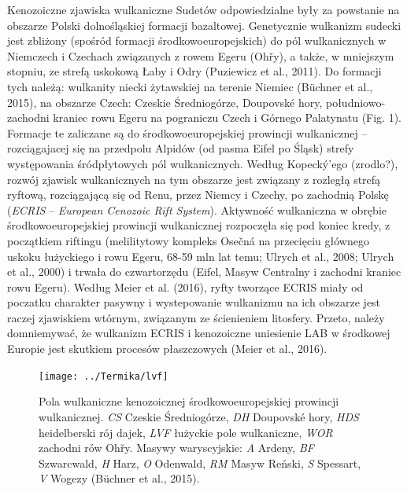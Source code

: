 \documentclass[11.5pt,twoside]{report}
\begin{document}
Kenozoiczne zjawiska wulkaniczne Sudetów odpowiedzialne były za powstanie na obszarze Polski dolnośląskiej formacji bazaltowej. Genetycznie wulkanizm sudecki jest zbliżony (spośród formacji środkowoeuropejskich) do pól wulkanicznych w Niemczech i Czechach związanych z rowem Egeru (Oh\v{r}y), a także, w mniejszym stopniu, ze strefą uskokową Łaby i Odry (Puziewicz et al., 2011). Do formacji tych należą: wulkanity niecki żytawskiej na terenie Niemiec (B\"{u}chner et al., 2015), na obszarze Czech: Czeskie Średniogórze, Doupovské hory, południowo-zachodni kraniec rowu Egeru na pograniczu Czech i Górnego Palatynatu (Fig. 1). Formacje te zaliczane są do środkowoeuropejskiej prowincji wulkanicznej -- rozciągajacej się na przedpolu Alpidów (od pasma Eifel po Śląsk) strefy występowania śródpłytowych pól wulkanicznych. Według Kopeck\'{y}'ego (zrodlo?), rozwój zjawisk wulkanicznych na tym obszarze jest związany z rozległą strefą ryftową, rozciągającą się od Renu, przez Niemcy i Czechy, po zachodnią Polskę (\textit{ECRIS} -- \textit{European Cenozoic Rift System}). Aktywność wulkaniczna w obrębie środkowoeuropejskiej prowincji wulkanicznej rozpoczęła się pod koniec kredy, z początkiem riftingu (melilitytowy kompleks Osečná na przecięciu głównego uskoku łużyckiego i rowu Egeru, 68-59 mln lat temu; Ulrych et al., 2008; Ulrych et al., 2000) i trwała do czwartorzędu (Eifel, Masyw Centralny i zachodni kraniec rowu Egeru). Według Meier et al. (2016), ryfty tworzące ECRIS miały od poczatku charakter pasywny i wystepowanie wulkanizmu na ich obszarze jest raczej zjawiskiem wtórnym, związanym ze ścienieniem litosfery. Przeto, należy domniemywać, że wulkanizm ECRIS i kenozoiczne uniesienie LAB w środkowej Europie jest skutkiem procesów płaszczowych (Meier et al., 2016).

\begin{figure}[h]
	\centering
	\texttt{[image: ../Termika/lvf]}
	\caption{Pola wulkaniczne kenozoicznej środkowoeuropejskiej prowincji wulkanicznej. \textit{CS} Czeskie Średniogórze, \textit{DH} Doupovsk\'{e} hory, \textit{HDS} heidelberski rój dajek, \textit{LVF} łużyckie pole wulkaniczne, \textit{WOR} zachodni rów Oh\v{r}y. Masywy waryscyjskie: \textit{A} Ardeny, \textit{BF} Szwarcwald, \textit{H} Harz, \textit{O} Odenwald, \textit{RM} Masyw Reński, \textit{S} Spessart, \textit{V} Wogezy (B\"{u}chner et al., 2015).} 
	\label{Fig.}
\end{figure}
\end{document}
